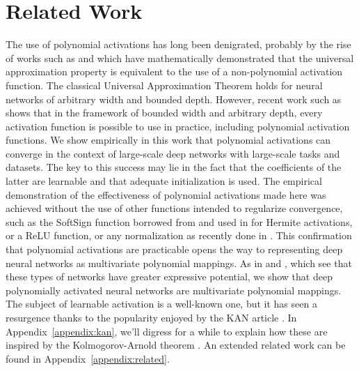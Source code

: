 \section{Related Work}
The use of polynomial activations has long been denigrated, probably by the rise of works such as \cite{pinkus1999approximation} and \cite{leshno1993multilayer} which have mathematically demonstrated that the universal approximation property is equivalent to the use of a non-polynomial activation function. The classical Universal Approximation Theorem \cite{cybenko1989approximation,hornik1990universal} holds for neural networks of arbitrary width and bounded depth. However, recent work such as \cite{kidger2020universal} shows that in the framework of bounded width and arbitrary depth, every activation function is possible to use in practice, including polynomial activation functions. We show empirically in this work that polynomial activations can converge in the context of large-scale deep networks with large-scale tasks and datasets. The key to this success may lie in the fact that the coefficients of the latter are learnable and that adequate initialization is used.
The empirical demonstration of the effectiveness of polynomial activations made here was achieved without the use of other functions intended to regularize convergence, such as the SoftSign function borrowed from \cite{turian2009quadratic} and used in \cite{lokhande2020generating} for Hermite activations, or a ReLU function, or any normalization as recently done in \cite{zhuo2024polynomial}.
This confirmation that polynomial activations are practicable opens the way to representing deep neural networks as multivariate polynomial mappings. As in \cite{kileel2019expressive} and \cite{kubjas2024geometry}, which see that these types of networks have greater expressive potential, we show that deep polynomially activated neural networks are multivariate polynomial mappings.
The subject of learnable activation is a well-known one, but it has seen a resurgence thanks to the popularity enjoyed by the KAN article \cite{liu2024kan}. In Appendix~\ref{appendix:kan}, we'll digress for a while to explain how these are inspired by the Kolmogorov-Arnold theorem \cite{kolmogorov1957representation}. An extended  related work can be found in Appendix~\ref{appendix:related}.